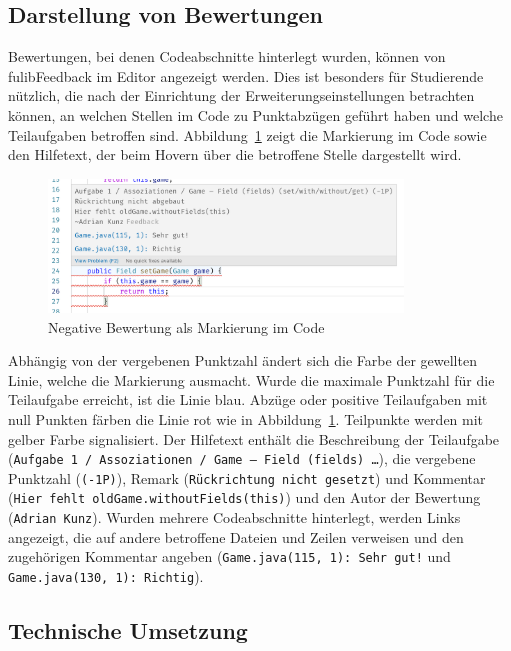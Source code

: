 \subsection{Darstellung von Bewertungen}

Bewertungen, bei denen Codeabschnitte hinterlegt wurden, können von fulibFeedback im Editor angezeigt werden.
Dies ist besonders für Studierende nützlich, die nach der Einrichtung der Erweiterungseinstellungen betrachten können, an welchen Stellen im Code zu Punktabzügen geführt haben und welche Teilaufgaben betroffen sind.
Abbildung~\ref{fig:fulibFeedback-negative} zeigt die Markierung im Code sowie den Hilfetext, der beim Hovern über die betroffene Stelle dargestellt wird.

\begin{figure}
    \centering
    \includegraphics[width=0.84\textwidth]{images/fulibFeedback-negative}
    \caption{Negative Bewertung als Markierung im Code}
    \label{fig:fulibFeedback-negative}
\end{figure}

Abhängig von der vergebenen Punktzahl ändert sich die Farbe der gewellten Linie, welche die Markierung ausmacht.
Wurde die maximale Punktzahl für die Teilaufgabe erreicht, ist die Linie blau.
Abzüge oder positive Teilaufgaben mit null Punkten färben die Linie rot wie in Abbildung~\ref{fig:fulibFeedback-negative}.
Teilpunkte werden mit gelber Farbe signalisiert.
Der Hilfetext enthält die Beschreibung der Teilaufgabe (\texttt{Aufgabe 1 / Assoziationen / Game -- Field (fields) \dots}), die vergebene Punktzahl (\texttt{(-1P)}), Remark (\texttt{Rückrichtung nicht gesetzt}) und Kommentar (\texttt{Hier fehlt oldGame.withoutFields(this)}) und den Autor der Bewertung (\texttt{Adrian Kunz}).
Wurden mehrere Codeabschnitte hinterlegt, werden Links angezeigt, die auf andere betroffene Dateien und Zeilen verweisen und den zugehörigen Kommentar angeben (\texttt{Game.java(115, 1): Sehr gut!} und \texttt{Game.java(130, 1): Richtig}).

\subsection{Technische Umsetzung}\label{subsec:fulibFeedback-tech}

